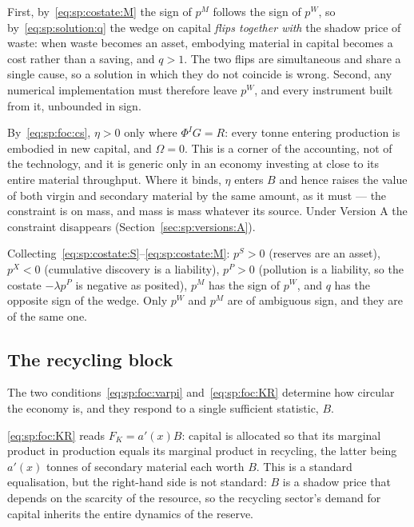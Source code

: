 First, by~\eqref{eq:sp:costate:M} the sign of $p^M$ follows the sign of $p^W$, so
by~\eqref{eq:sp:solution:q} the wedge on capital \emph{flips together with} the shadow price of
waste: when waste becomes an asset, embodying material in capital becomes a cost rather than a
saving, and $q>1$. The two flips are simultaneous and share a single cause, so a solution in which
they do not coincide is wrong. Second, any numerical implementation must therefore leave $p^W$, and
every instrument built from it, unbounded in sign.

 By~\eqref{eq:sp:foc:cs}, $\eta>0$ only where $\Phi^IG=R$: every
tonne entering production is embodied in new capital, and $\Omega=0$. This is a corner of the
accounting, not of the technology, and it is generic only in an economy investing at close to its
entire material throughput. Where it binds, $\eta$ enters $B$ and hence raises the value of both
virgin and secondary material by the same amount, as it must --- the constraint is on mass, and mass
is mass whatever its source. Under Version A the constraint disappears
(Section~\ref{sec:sp:versions:A}).

 Collecting~\eqref{eq:sp:costate:S}--\eqref{eq:sp:costate:M}: $p^S>0$
(reserves are an asset), $p^X<0$ (cumulative discovery is a liability), $p^P>0$ (pollution is a
liability, so the costate $-\lambda p^P$ is negative as posited), $p^M$ has the sign of $p^W$, and
$q$ has the opposite sign of the wedge. Only $p^W$ and $p^M$ are of ambiguous sign, and they are of
the same one.


\subsection{The recycling block}\label{sec:sp:solution:recycling}

The two conditions~\eqref{eq:sp:foc:varpi} and~\eqref{eq:sp:foc:KR} determine how circular the
economy is, and they respond to a single sufficient statistic, $B$.

 \eqref{eq:sp:foc:KR} reads $F_K=a'(x)B$: capital is allocated so
that its marginal product in production equals its marginal product in recycling, the latter being
$a'(x)$ tonnes of secondary material each worth $B$. This is a standard equalisation, but the
right-hand side is not standard: $B$ is a shadow price that depends on the scarcity of the resource,
so the recycling sector's demand for capital inherits the entire dynamics of the reserve.

